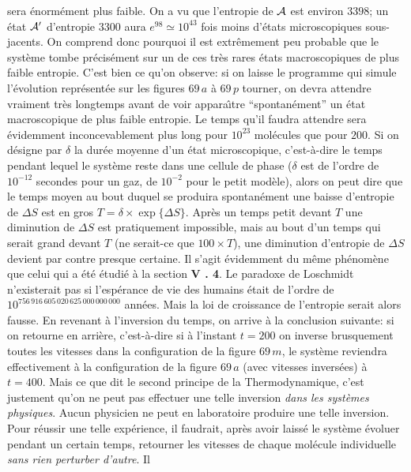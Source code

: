 sera \'enorm\'ement plus faible. On a vu que l'entropie de ${\cal A}$ est 
environ $3398$; un \'etat ${\cal A}'$ d'entropie $3300$ aura $e^{98}
\simeq 10^{43}$ fois moins d'\'etats microscopiques sous-jacents.
On comprend donc pourquoi il est extr\^emement peu probable que le syst\`eme
tombe pr\'ecis\'ement sur un de ces tr\`es rares \'etats macroscopiques 
de plus faible entropie. C'est bien ce qu'on observe: si on laisse le 
programme qui simule l'\'evolution repr\'esent\'ee sur les figures $69\, a$ 
\`a $69\, p$ tourner, on devra attendre vraiment tr\`es longtemps avant de 
voir appara{\^\i}tre ``spontan\'ement'' un \'etat macroscopique de plus 
faible entropie.  Le temps qu'il faudra attendre sera \'evidemment 
inconcevablement plus long pour $10^{23}$ mol\'ecules que pour $200$. 
Si on d\'esigne par $\delta$ la dur\'ee moyenne d'un \'etat microscopique, 
c'est-\`a-dire le temps pendant lequel le syst\`eme reste dans une cellule 
de phase ($\delta$ est de l'ordre de $10^{-12}$ secondes pour un gaz, de
$10^{-2}$ pour le petit mod\`ele), alors on peut dire que le temps
moyen au bout duquel se produira spontan\'ement une baisse d'entropie de
$\Delta S$ est en gros $T = \delta \times \exp\{ \Delta S \}$. Apr\`es un
temps petit devant $T$ une diminution de $\Delta S$ est pratiquement
impossible, mais au bout d'un temps qui serait grand devant $T$ (ne serait-ce
que $100 \times T$), une diminution d'entropie de $\Delta S$ devient par 
contre presque certaine. Il s'agit \'evidemment du m\^eme ph\'enom\`ene que
celui qui a \'et\'e \'etudi\'e \`a la section {\bf V\kern-2pt .\kern2pt 4}. 
Le paradoxe de Loschmidt n'existerait pas si l'esp\'erance de vie des humains 
\'etait de l'ordre de $10^{756\, 916\, 605\, 020\, 625\, 000\, 000\, 000}$
ann\'ees. Mais la loi de croissance de l'entropie serait alors fausse.
\medskip 
En revenant \`a l'inversion du temps, on arrive \`a la 
conclusion suivante: si on retourne en arri\`ere, c'est-\`a-dire si 
\`a l'instant $t=200$ on inverse brusquement toutes les vitesses dans 
la configuration de la figure $69\, m$, le syst\`eme reviendra effectivement 
\`a la configuration de la figure $69\, a$ (avec vitesses invers\'ees) \`a 
$t = 400$. Mais ce que dit le second principe de la Thermodynamique, c'est 
justement qu'on ne peut pas effectuer une telle inversion {\it dans les 
syst\`emes physiques}. Aucun 
physicien ne peut en laboratoire produire une telle inversion. 
Pour r\'eussir une telle exp\'erience, il faudrait, apr\`es avoir laiss\'e 
le syst\`eme \'evoluer pendant un certain temps, retourner les vitesses 
de chaque mol\'ecule individuelle {\it sans rien perturber d'autre}. Il 
